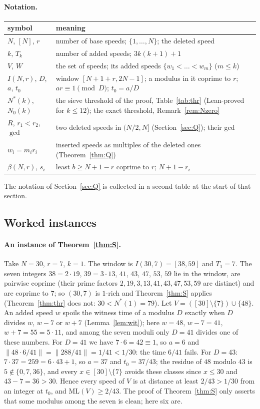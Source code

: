 \documentclass[11pt]{article}
\theoremstyle{definition}
\theoremstyle{remark}
\newcommand{\nd}[1]{\lVert #1\rVert}
\newcommand{\ML}{\mathrm{ML}}
\begin{document}
\paragraph{Notation.}
\begin{center}
\small
\begin{tabular}{l p{}}
\toprule
symbol & meaning \\
\midrule
$N$, $[N]$, $r$ & number of base speeds; $\{1,\dots,N\}$; the deleted speed \\
$k$, $T_k$ & number of added speeds; $3k(k+1)+1$ \\
$V$, $W$ & the set of speeds; its added speeds $\{w_1<\dots<w_m\}$ ($m\le k$) \\
$I(N,r)$, $D$, $a$, $t_0$ & window $[N+1+r,2N-1]$; a modulus in it coprime to $r$; $ar\equiv1\pmod D$; $t_0=a/D$ \\
$N^*(k)$, $N_0(k)$ & the sieve threshold of the proof, Table~\ref{tab:thr} (Lean-proved for $k\le12$); the exact threshold, Remark~\ref{rem:Nzero} \\
$R$, $r_1<r_2$, $\gcd$ & two deleted speeds in $(N/2,N]$ (Section~\ref{sec:Q}); their gcd \\
$w_i=m_ir_i$ & inserted speeds as multiples of the deleted ones (Theorem~\ref{thm:Q}) \\
$\beta(N,r)$, $s_i$ & least $b\ge N+1-r$ coprime to $r$; $N+1-r_i$ \\
\bottomrule
\end{tabular}
\end{center}
The notation of Section~\ref{sec:Q} is collected in a second table at the start of that section.

\subsection{Worked instances}
\paragraph{An instance of Theorem~\ref{thm:S}.}
Take $N=30$, $r=7$, $k=1$. The window is $I(30,7)=[38,59]$ and $T_1=7$. The seven integers $38=2\cdot19$, $39=3\cdot13$, $41$, $43$, $47$, $53$, $59$ lie in the window, are pairwise coprime (their prime factors $2,19,3,13,41,43,47,53,59$ are distinct) and are coprime to $7$; so $(30,7)$ is $1$-rich and Theorem~\ref{thm:S} applies (Theorem~\ref{thm:thr} does not: $30<N^*(1)=79$). Let $V=([30]\setminus\{7\})\cup\{48\}$. An added speed $w$ spoils the witness time of a modulus $D$ exactly when $D$ divides $w$, $w-7$ or $w+7$ (Lemma~\ref{lem:wit}); here $w=48$, $w-7=41$, $w+7=55=5\cdot11$, and among the seven moduli only $D=41$ divides one of these numbers. For $D=41$ we have $7\cdot6=42\equiv1$, so $a=6$ and $\nd{48\cdot6/41}=\nd{288/41}=1/41<1/30$: the time $6/41$ fails. For $D=43$: $7\cdot37=259=6\cdot43+1$, so $a=37$ and $t_0=37/43$; the residue of $48$ modulo $43$ is $5\notin\{0,7,36\}$, and every $x\in[30]\setminus\{7\}$ avoids these classes since $x\le30$ and $43-7=36>30$. Hence every speed of $V$ is at distance at least $2/43>1/30$ from an integer at $t_0$, and $\ML(V)\ge2/43$. The proof of Theorem~\ref{thm:S} only asserts that some modulus among the seven is clean; here six are.
\end{document}
